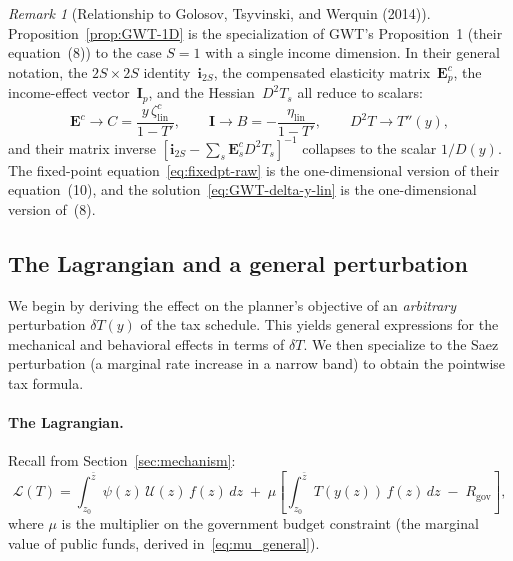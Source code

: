 \documentclass[12pt,a4paper]{article}
\theoremstyle{definition}
\theoremstyle{plain}
\theoremstyle{remark}
\newtheorem{remark}{Remark}[section]
\newcommand{\zbar}{\bar{z}}
\newcommand{\zlow}{z_{\scriptscriptstyle 0}}
\newcommand{\calU}{\mathcal{U}}
\begin{document}
\begin{remark}[Relationship to Golosov, Tsyvinski, and Werquin (2014)]
\label{rem:GWT-relation}
Proposition~\ref{prop:GWT-1D} is the specialization of GWT's Proposition~1 (their equation~(8)) to the case $S = 1$ with a single income dimension.  In their general notation, the $2S \times 2S$ identity~$\mathbf{i}_{2S}$, the compensated elasticity matrix~$\mathbf{E}^c_p$, the income-effect vector~$\mathbf{I}_p$, and the Hessian~$D^2 T_s$ all reduce to scalars:
\[
  \mathbf{E}^c \to C = \frac{y\,\zeta^c_{\mathrm{lin}}}{1-T'},
  \qquad
  \mathbf{I} \to B = -\frac{\eta_{\mathrm{lin}}}{1-T'},
  \qquad
  D^2 T \to T''(y),
\]
and their matrix inverse $[\mathbf{i}_{2S} - \sum_s \mathbf{E}^c_s D^2 T_s]^{-1}$ collapses to the scalar $1/D(y)$.  The fixed-point equation~\eqref{eq:fixedpt-raw} is the one-dimensional version of their equation~(10), and the solution~\eqref{eq:GWT-delta-y-lin} is the one-dimensional version of~(8).
\end{remark}

\subsection{The Lagrangian and a general perturbation}
\label{sec:perturb-setup}

We begin by deriving the effect on the planner's objective of an \emph{arbitrary} perturbation $\delta T(y)$ of the tax schedule. This yields general expressions for the mechanical and behavioral effects in terms of $\delta T$. We then specialize to the Saez perturbation (a marginal rate increase in a narrow band) to obtain the pointwise tax formula.

\paragraph{The Lagrangian.}
Recall from Section~\ref{sec:mechanism}:
\[
\mathcal{L}(T)
=
\int_{\zlow}^{\zbar} \psi(z)\,\calU(z)\,f(z)\,dz
\;+\;
\mu
\left[
\int_{\zlow}^{\zbar}
T(y(z))\,f(z)\,dz
\;-\; R_{\mathrm{gov}}
\right],
\]
where $\mu$ is the multiplier on the government budget
constraint (the marginal value of public funds, derived
in~\eqref{eq:mu_general}).
\end{document}
